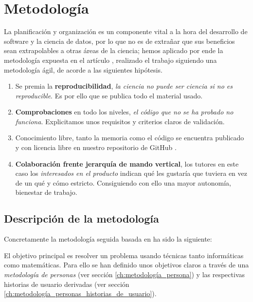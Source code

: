 %

\chapter{Metodología}

La planificación y organización es un componente vital a la hora del desarrollo de software 
y la ciencia de datos, por lo que no es de extrañar que sus beneficios sean extrapolables
a otras áreas de la ciencia; 
hemos aplicado por ende la 
metodología expuesta en el artículo \cite{DBLP:journals/corr/abs-2104-12545}, realizado 
el trabajo siguiendo una metodología ágil, de acorde a las siguientes hipótesis. 

\begin{enumerate}
    \item Se premia la \textbf{reproducibilidad}, \textit{la ciencia no puede ser ciencia si no es reproducible}. Es por 
    ello que se publica todo el material usado. 
    \item \textbf{Comprobaciones} en todo los niveles, \textit{el código que no se ha probado no funciona}. 
    Explicitamos unos requisitos y criterios claros de validación. 
    \item Conocimiento libre, tanto la memoria como el código se encuentra publicado y con licencia libre en nuestro repositorio 
    de GitHub \cite{TFG-Estudio-de-las-redes-neuronales}.
    \item \textbf{Colaboración frente jerarquía de mando vertical}, los tutores en este caso 
    los \textit{interesados en el producto} 
    indican qué les gustaría que tuviera en vez de un qué y cómo estricto. Consiguiendo con ello una mayor autonomía, bienestar de trabajo.
     
\end{enumerate}  

\section{Descripción de la metodología }  

Concretamente la metodología seguida basada en \cite{que-es-un-trabajo-fin-de-x} ha sido la siguiente: 

El objetivo principal es resolver un problema usando técnicas tanto informáticas como matemáticas. Para ello 
se han definido unos objetivos claros a través de una \textit{metodología de personas} 
(ver sección \ref{ch:metodología_persona}) \cite{personas-why-and-how-you-should-use-them}
y las respectivas historias de usuario derivadas (ver sección \ref{ch:metodología_personas_historias_de_usuario}).   

